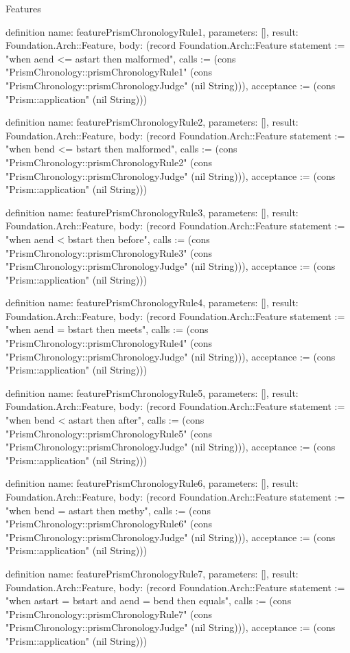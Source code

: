 \begin{lexlean}{Features}
\begin{semanticmodule}
definition{
  name: featurePrismChronologyRule1,
  parameters: [],
  result: Foundation.Arch::Feature,
  body: (record Foundation.Arch::Feature {statement := "when aend <= astart then malformed", calls := (cons "PrismChronology::prismChronologyRule1" (cons "PrismChronology::prismChronologyJudge" (nil String))), acceptance := (cons "Prism::application" (nil String))})
}

definition{
  name: featurePrismChronologyRule2,
  parameters: [],
  result: Foundation.Arch::Feature,
  body: (record Foundation.Arch::Feature {statement := "when bend <= bstart then malformed", calls := (cons "PrismChronology::prismChronologyRule2" (cons "PrismChronology::prismChronologyJudge" (nil String))), acceptance := (cons "Prism::application" (nil String))})
}

definition{
  name: featurePrismChronologyRule3,
  parameters: [],
  result: Foundation.Arch::Feature,
  body: (record Foundation.Arch::Feature {statement := "when aend < bstart then before", calls := (cons "PrismChronology::prismChronologyRule3" (cons "PrismChronology::prismChronologyJudge" (nil String))), acceptance := (cons "Prism::application" (nil String))})
}

definition{
  name: featurePrismChronologyRule4,
  parameters: [],
  result: Foundation.Arch::Feature,
  body: (record Foundation.Arch::Feature {statement := "when aend = bstart then meets", calls := (cons "PrismChronology::prismChronologyRule4" (cons "PrismChronology::prismChronologyJudge" (nil String))), acceptance := (cons "Prism::application" (nil String))})
}

definition{
  name: featurePrismChronologyRule5,
  parameters: [],
  result: Foundation.Arch::Feature,
  body: (record Foundation.Arch::Feature {statement := "when bend < astart then after", calls := (cons "PrismChronology::prismChronologyRule5" (cons "PrismChronology::prismChronologyJudge" (nil String))), acceptance := (cons "Prism::application" (nil String))})
}

definition{
  name: featurePrismChronologyRule6,
  parameters: [],
  result: Foundation.Arch::Feature,
  body: (record Foundation.Arch::Feature {statement := "when bend = astart then metby", calls := (cons "PrismChronology::prismChronologyRule6" (cons "PrismChronology::prismChronologyJudge" (nil String))), acceptance := (cons "Prism::application" (nil String))})
}

definition{
  name: featurePrismChronologyRule7,
  parameters: [],
  result: Foundation.Arch::Feature,
  body: (record Foundation.Arch::Feature {statement := "when astart = bstart and aend = bend then equals", calls := (cons "PrismChronology::prismChronologyRule7" (cons "PrismChronology::prismChronologyJudge" (nil String))), acceptance := (cons "Prism::application" (nil String))})
}


\end{semanticmodule}
\end{lexlean}
